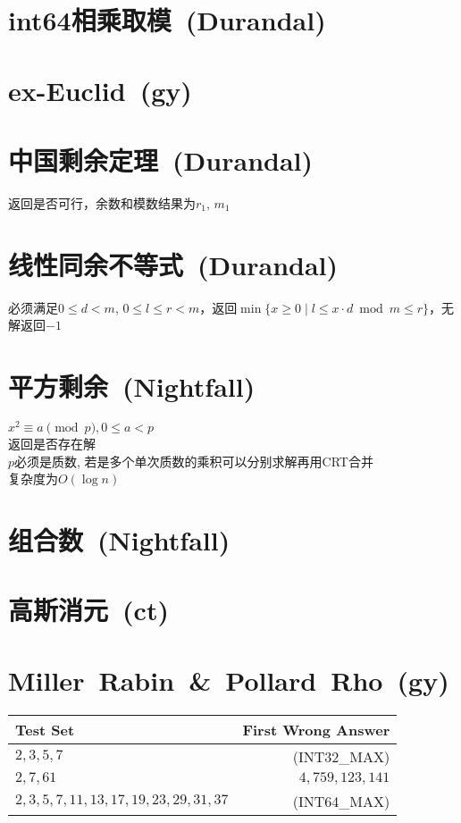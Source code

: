 \section{int64相乘取模\ \small(Durandal)}
\section{ex-Euclid\ \small(gy)}
\section{中国剩余定理\ \small(Durandal)}
	返回是否可行，余数和模数结果为$ r_1 $, $ m_1 $
\section{线性同余不等式\ \small(Durandal)}
	必须满足$ 0 \leq d < m $, $ 0 \leq l \leq r < m $，返回$ \min\lbrace x \geq 0 \mid l \leq x \cdot d \bmod m \leq r \rbrace $，无解返回$ -1 $ 
\section{平方剩余\ \small(Nightfall)}
	$ x^2 \equiv a \pmod p, 0 \leq a < p $
	\\返回是否存在解
	\\$ p $必须是质数, 若是多个单次质数的乘积可以分别求解再用CRT合并
	\\复杂度为$ O(\log n) $
\section{组合数\ \small(Nightfall)}
\section{高斯消元\ \small(ct)}
\section{Miller\ Rabin\ \&\ Pollard\ Rho\ \small(gy)}
	\begin{tabular}{l r}
		\hline
		Test Set & First Wrong Answer\\\hline
		$ 2, 3, 5, 7 $ & (INT32\_MAX)\\\hline
		$ 2, 7, 61 $ & $ 4,759,123,141 $\\\hline
		$ 2, 3, 5, 7, 11, 13, 17, 19, 23, 29, 31, 37 $ & (INT64\_MAX)\\\hline
	\end{tabular}
